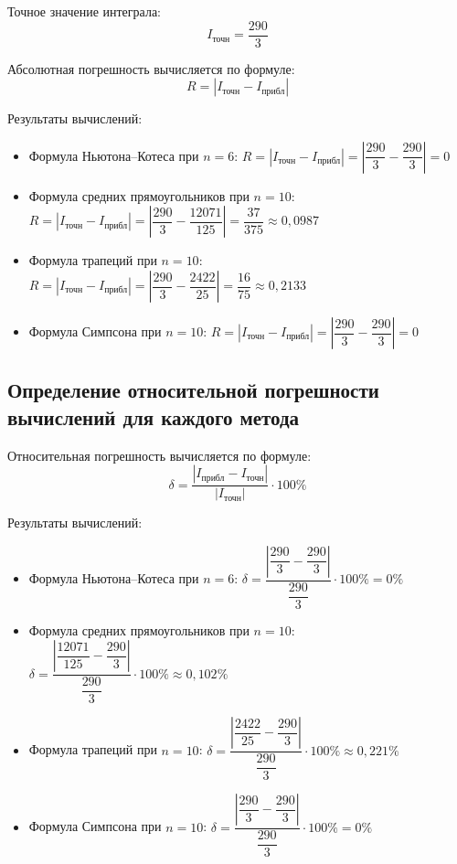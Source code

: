 Точное значение интеграла:
\[
I_{\text{точн}} = \frac{290}{3}
\]

Абсолютная погрешность вычисляется по формуле:
\[
R = |I_{\text{точн}} - I_{\text{прибл}}|
\]

Результаты вычислений:

\begin{itemize}
\item Формула Ньютона--Котеса при $n=6$: $R = |I_{\text{точн}} - I_{\text{прибл}}| = \left|\dfrac{290}{3} - \dfrac{290}{3}\right| = 0$

\item Формула средних прямоугольников при $n=10$: $R = |I_{\text{точн}} - I_{\text{прибл}}| = \left|\dfrac{290}{3} - \dfrac{12071}{125}\right| = \dfrac{37}{375} \approx 0{,}0987$

\item Формула трапеций при $n=10$: $R = |I_{\text{точн}} - I_{\text{прибл}}| = \left|\dfrac{290}{3} - \dfrac{2422}{25}\right| = \dfrac{16}{75} \approx 0{,}2133$

\item Формула Симпсона при $n=10$: $R = |I_{\text{точн}} - I_{\text{прибл}}| = \left|\dfrac{290}{3} - \dfrac{290}{3}\right| = 0$
\end{itemize}



\subsection{Определение относительной погрешности вычислений для каждого метода}

Относительная погрешность вычисляется по формуле:
\[
\delta = \frac{|I_{\text{прибл}} - I_{\text{точн}}|}{|I_{\text{точн}}|} \cdot 100\%
\]

Результаты вычислений:

\begin{itemize}
\item Формула Ньютона--Котеса при $n=6$: $\delta = \dfrac{\left|\dfrac{290}{3} - \dfrac{290}{3}\right|}{\dfrac{290}{3}} \cdot 100\% = 0\%$

\item Формула средних прямоугольников при $n=10$: $\delta = \dfrac{\left|\dfrac{12071}{125} - \dfrac{290}{3}\right|}{\dfrac{290}{3}} \cdot 100\% \approx 0{,}102\%$

\item Формула трапеций при $n=10$: $\delta = \dfrac{\left|\dfrac{2422}{25} - \dfrac{290}{3}\right|}{\dfrac{290}{3}} \cdot 100\% \approx 0{,}221\%$

\item Формула Симпсона при $n=10$: $\delta = \dfrac{\left|\dfrac{290}{3} - \dfrac{290}{3}\right|}{\dfrac{290}{3}} \cdot 100\% = 0\%$
\end{itemize}
